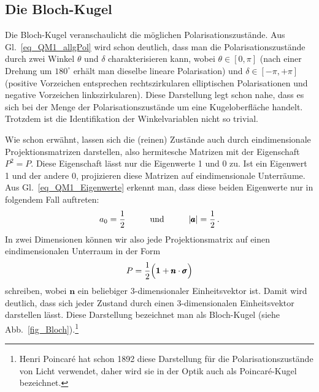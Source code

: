 \subsection{Die Bloch-Kugel}

Die Bloch-Kugel 
veranschaulicht die m\"oglichen Polarisationszust\"ande. Aus Gl.\ \ref{eq_QM1_allgPol} wird schon
deutlich, dass man die Polarisationszust\"ande durch zwei Winkel $\theta$ und $\delta$ charakterisieren kann,
wobei $\theta \in [0,\pi]$ (nach einer Drehung um $180^\circ$ erh\"alt man dieselbe lineare Polarisation) 
und $\delta \in [-\pi,+\pi]$ (positive Vorzeichen entsprechen rechtszirkularen elliptischen Polarisationen und
negative Vorzeichen linkszirkularen). Diese Darstellung legt schon nahe, dass es sich bei der Menge der
Polarisationszust\"ande um eine Kugeloberfl\"ache handelt. 
Trotzdem ist die Identifikation der Winkelvariablen nicht so trivial.

Wie schon erw\"ahnt, lassen sich die (reinen) Zust\"ande auch durch eindimensionale Projektionsmatrizen darstellen, 
also hermitesche Matrizen mit der Eigenschaft $P^2=P$. 
Diese Eigenschaft l\"asst nur die Eigenwerte 1 und 0 zu.
Ist ein Eigenwert 1 und der andere 0, projizieren diese
Matrizen auf eindimensionale Unterr\"aume. Aus Gl.\ \ref{eq_QM1_Eigenwerte} erkennt man, dass diese beiden
Eigenwerte nur in folgendem Fall auftreten:
\begin{equation}
      a_0 = \frac{1}{2}   \hspace{1cm} {\rm und} \hspace{1cm}  |\pmb{a}| = \frac{1}{2} \, .
\end{equation}
In zwei Dimensionen k\"onnen wir also jede Projektionsmatrix auf einen eindimensionalen Unterraum 
in der Form
\begin{equation}
         P =  \frac{1}{2} \Big( {\bf 1} + \pmb{n} \cdot \pmb{\sigma} \Big) 
\end{equation}
schreiben, wobei $\pmb{n}$ ein beliebiger 3-dimensionaler Einheitsvektor ist. Damit wird deutlich, dass sich jeder Zustand
durch einen 3-dimensionalen Einheitsvektor darstellen l\"asst. Diese Darstellung bezeichnet man als 
Bloch-Kugel (siehe Abb.\ \ref{fig_Bloch}).\footnote{Henri Poincar\'{e} hat schon 1892 diese Darstellung f\"ur die Polarisationszust\"ande
von Licht verwendet, daher wird sie in der Optik auch als Poincar\'{e}-Kugel bezeichnet.}

